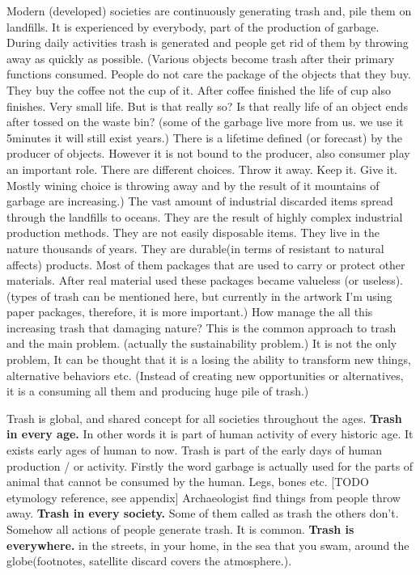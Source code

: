 Modern (developed) societies are continuously generating trash and, pile them on landfills. It is experienced by everybody, part of the production of garbage. During daily activities trash is generated and people get rid of them by throwing away as quickly as possible. (Various objects become trash after their primary functions consumed. People do not care the package of the objects that they buy. They buy the coffee not the cup of it. After coffee finished the life of cup also finishes. Very small life. But is that really so? Is that really life of an object ends after tossed on the waste bin?  (some of the garbage live more from us. we use it 5minutes it will still exist years.) There is a lifetime defined (or forecast) by the producer of objects. However it is not bound to the producer, also consumer play an important role. There are different choices. Throw it away. Keep it. Give it. Mostly wining choice is throwing away and by the result of it mountains of garbage are increasing.) The vast amount of industrial discarded items spread through the landfills to oceans. They are the result of highly complex industrial production methods. They are not easily disposable items. They live in the nature thousands of years. They are durable(in terms of resistant to natural affects) products. Most of them packages that are used to carry or protect other materials. After real material used these packages became valueless (or useless). (types of trash can be mentioned here, but currently in the artwork I'm using paper packages, therefore, it is more important.) How manage the all this increasing trash that damaging nature?  This is the common approach to trash and the main problem. (actually the sustainability problem.) It is not the only problem, It can be thought that it is a losing the ability to transform new things, alternative behaviors etc. (Instead of creating new opportunities or alternatives, it is a consuming all them and producing huge pile of trash.) 

Trash is global, and shared concept for all societies throughout the ages. 
\textbf{Trash in every age.} In other words it is part of human activity of every historic age. It exists early ages of human to now. Trash is part of the early days of human production / or activity. Firstly the word garbage is actually used for the parts of animal that cannot be consumed by the human. Legs, bones etc. [TODO etymology reference, see appendix] Archaeologist find things from people throw away. 
\textbf{Trash in every society.} Some of them called as trash the others don't. Somehow all actions of people generate trash. It is common. 
\textbf{Trash is everywhere.} in the streets, in your home, in the sea that you swam, around the globe(footnotes, satellite discard covers the atmosphere.).

